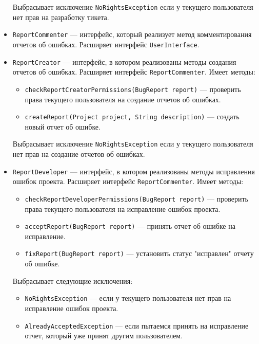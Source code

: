 \begin{itemize}
		Выбрасывает исключение \texttt{NoRightsException} если у текущего пользователя нет прав на разработку тикета.
		
		\item \texttt{ReportCommenter} --- интерфейс, который реализует метод комментирования отчетов об ошибках. Расширяет интерфейс \texttt{UserInterface}.
		
		\item \texttt{ReportCreator} --- интерфейс, в котором реализованы методы создания отчетов об ошибках. Расширяет интерфейс \texttt{ReportCommenter}. Имеет методы:
		\begin{itemize}
			\item \texttt{checkReportCreatorPermissions(BugReport report)} --- проверить права текущего пользователя на создание отчетов об ошибках.
			\item \texttt{createReport(Project project, String description)} --- создать новый отчет об ошибке.
		\end{itemize}
		
		Выбрасывает исключение \texttt{NoRightsException} если у текущего пользователя нет прав на создание отчетов об ошибках.
		
		\item \texttt{ReportDeveloper} --- интерфейс, в котором реализованы методы исправления ошибок проекта. Расширяет интерфейс \texttt{ReportCommenter}. Имеет методы:
		\begin{itemize}
			\item \texttt{checkReportDeveloperPermissions(BugReport report)} --- проверить права текущего пользователя на исправление ошибок проекта.
			\item \texttt{acceptReport(BugReport report)} --- принять отчет об ошибке на исправление.
			\item \texttt{fixReport(BugReport report)} --- установить статус "исправлен" отчету об ошибке.
		\end{itemize}
		
		Выбрасывает следующие исключения:
		\begin{itemize}
			\item \texttt{NoRightsException} --- если у текущего пользователя нет прав на исправление ошибок проекта.
			\item \texttt{AlreadyAcceptedException} --- если пытаемся принять на исправление отчет, который уже принят другим пользователем.
		\end{itemize}
		

\end{itemize}
